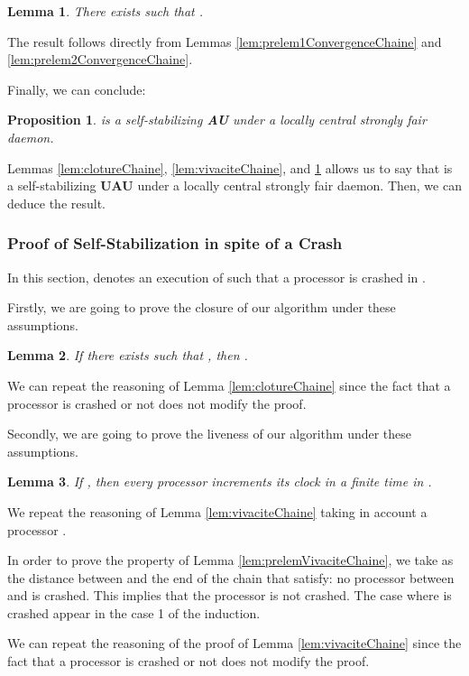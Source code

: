\documentclass[11pt,english,letterpaper]{article}
\newtheorem{lemma}{Lemma}
\newtheorem{proposition}{Proposition}
\newenvironment{proof}{{\noindent\bf Proof. } }{{\hfill }}
\begin{document}
\begin{lemma}\label{lem:convergenceChaine}
There exists  such that .
\end{lemma}

\begin{proof}
The result follows directly from Lemmas \ref{lem:prelem1ConvergenceChaine} and \ref{lem:prelem2ConvergenceChaine}.
\end{proof}

Finally, we can conclude:

\begin{proposition}\label{prop:SSChaine}
 is a self-stabilizing \textbf{AU} under a locally central strongly fair daemon.
\end{proposition}

\begin{proof}
Lemmas \ref{lem:clotureChaine}, \ref{lem:vivaciteChaine}, and \ref{lem:convergenceChaine} allows us to say that  is a self-stabilizing \textbf{UAU} under a locally central strongly fair daemon. Then, we can deduce the result.
\end{proof}

\subsubsection{Proof of Self-Stabilization in spite of a Crash}
	
In this section,  denotes an execution of  such that a processor  is crashed in .

Firstly, we are going to prove the closure of our algorithm under these assumptions.

\begin{lemma}\label{lem:clotureCrashChaine}
If there exists  such that , then .
\end{lemma}

\begin{proof}
We can repeat the reasoning of Lemma \ref{lem:clotureChaine} since the fact that a processor is crashed or not does not modify the proof.
\end{proof}

Secondly, we are going to prove the liveness of our algorithm under these assumptions.

\begin{lemma}\label{lem:vivaciteCrashChaine}
If , then every processor  increments its clock in a finite time in .
\end{lemma}

\begin{proof}
We repeat the reasoning of Lemma \ref{lem:vivaciteChaine} taking in account a processor .

In order to prove the property of Lemma \ref{lem:prelemVivaciteChaine}, we take  as the distance between  and the end  of the chain that satisfy: no processor between  and  is crashed. This implies that the processor  is not crashed. The case where  is crashed appear in the case 1 of the induction.

We can repeat the reasoning of the proof of Lemma \ref{lem:vivaciteChaine} since the fact that a processor is crashed or not does not modify the proof.
\end{proof}
			
\end{document}
